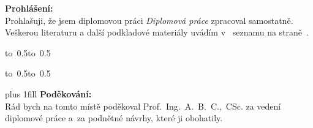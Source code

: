 \documentclass[12pt,a4paper]{report}
\begin{document}
\noindent
{\bfseries Prohlášení:} \\
Prohlašuji, že jsem diplomovou práci \emph{Diplomová práce} zpracoval samostatně. Veškerou literaturu a další podkladové materiály uvádím v~ seznamu na straně~\pageref{literatura}.

\vspace{10mm}

\hbox{\hbox to 0.5\hbox to 0.5}

\vspace{1mm}
\hbox{\hbox to 0.5\hsize{%

\hss}\hbox to 0.5}

\vspace{20mm}

\newpage

\vglue 0pt plus 1fill
\noindent
{\bfseries Poděkování:} \\
Rád bych na tomto místě poděkoval Prof.~Ing.~A.~B.~C.,~CSc. za vedení  diplomové práce a~za podnětné návrhy, které ji obohatily. 


\newpage
\end{document}

